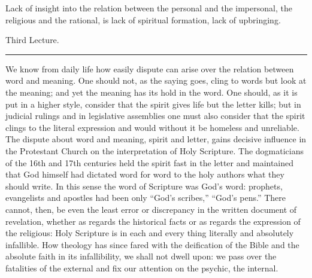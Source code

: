 \documentclass[12pt,a4paper,openany]{book}
\newcommand{\opage}[1]{\marginnote{\footnotesize\textit{[#1]}}}
\newcommand{\lecture}[1]{\clearpage\begin{center}{\large #1}\\[0.4em]\rule{3em}{0.4pt}\end{center}\medskip\noindent}
\begin{document}
Lack of insight into the relation between the personal and the
impersonal, the religious and the rational, is lack of spiritual
formation, lack of upbringing.

\lecture{Third Lecture.}
\opage{34}We know from daily life how easily dispute can arise over the relation
between word and meaning. One should not, as the saying goes, cling to
words but look at the meaning; and yet the meaning has its hold in the
word. One should, as it is put in a higher style, consider that the
spirit gives life but the letter kills; but in judicial rulings and in
legislative assemblies one must also consider that the spirit clings to
the literal expression and would without it be homeless and unreliable.
The dispute about word and meaning, spirit and letter, gains decisive
influence in the Protestant Church on the interpretation of Holy
Scripture. The dogmaticians of the 16th and 17th centuries held the
spirit fast in the letter and maintained that God himself had dictated
word for word to the holy authors what they should write. In this sense
the word of Scripture was God's word: prophets, evangelists and apostles
had been only ``God's scribes,'' ``God's pens.'' There cannot, then, be
even the least error or discrepancy in the written document of
revelation, whether as regards the historical facts or as regards the
expression of the religious: Holy Scripture is in each and every thing
\opage{35}literally and absolutely infallible. How theology has since fared with
the deification of the Bible and the absolute faith in its
infallibility, we shall not dwell upon: we pass over the fatalities of
the external and fix our attention on the psychic, the internal.
\end{document}
